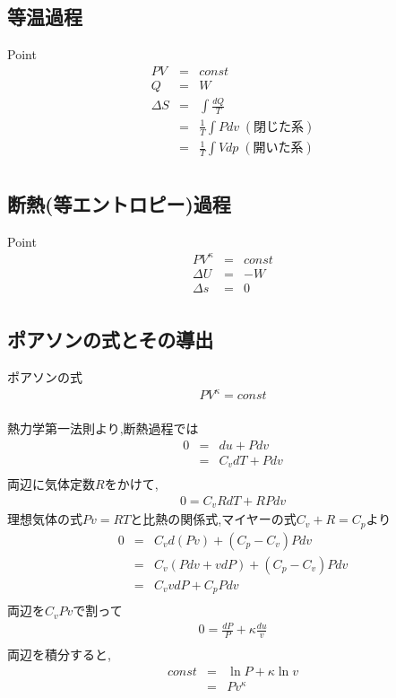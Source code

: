 \documentclass[a4paper]{jsarticle}
\begin{document}
\subsection{等温過程}
\begin{itembox}[l]{Point}
    \begin{eqnarray*}
        PV&=&const\\
        Q&=&W\\
        \Delta S
        &=& \int \frac{dQ}{T}\\
        &=& \frac{1}{T}\int Pdv\;(閉じた系)\\
        &=& \frac{1}{T}\int Vdp\;(開いた系)\\
    \end{eqnarray*}
\end{itembox}
\subsection{断熱(等エントロピー)過程}
\begin{itembox}[l]{Point}
    \begin{eqnarray*}
        PV^\kappa&=&const\\
        \Delta U&=&- W\\
        \Delta s&=&0\\
    \end{eqnarray*}
\end{itembox}
\subsection{ポアソンの式とその導出}
\begin{itembox}[l]{ポアソンの式}
    \begin{eqnarray*}
        PV^\kappa=const\\
    \end{eqnarray*}
\end{itembox}
熱力学第一法則より,断熱過程では
\begin{eqnarray*}
    0
    &=&du+Pdv\\
    &=&C_vdT+Pdv\\
\end{eqnarray*}
両辺に気体定数$R$をかけて,
\begin{eqnarray*}
    0=C_vRdT+RPdv
\end{eqnarray*}
理想気体の式$Pv=RT$と比熱の関係式,マイヤーの式$C_v+R=C_p$より
\begin{eqnarray*}
    0&=&C_vd\left(Pv\right)+\left(C_p-C_v\right)Pdv\\
    &=&C_v\left(Pdv+vdP\right)+\left(C_p-C_v\right)Pdv\\
    &=&C_vvdP+C_pPdv\\
\end{eqnarray*}
両辺を$C_vPv$で割って
\begin{eqnarray*}
    0=\frac{dP}{P}+\kappa\frac{du}{v}\\
\end{eqnarray*}
両辺を積分すると,
\begin{eqnarray*}
    const&=&\ln P+\kappa\ln v\\
    &=&Pv^\kappa\\
\end{eqnarray*}
\end{document}
